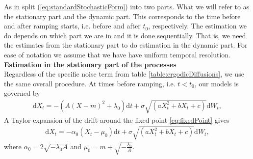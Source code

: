 As in \cite{Ditlevsen2023} split (\ref{eq:standardStochasticForm}) into two parts. What we will refer to as the stationary part and the dynamic part. This corresponds to the time before and after ramping starts, i.e. before and after $t_0$, respectively. The estimation we do depends on which part we are in and it is done sequentially. That is, we need the estimates from the stationary part to do estimation in the dynamic part. For ease of notation we assume that we have have uniform temporal resolution. \\
\textbf{Estimation in the stationary part of the processes}\\
Regardless of the specific noise term from table \ref{table:ergodicDiffusions}, we use the same overall procedure. At times before ramping, i.e. $t < t_0$, our models is governed by
\begin{align}
    \mathrm{d}X_t = -\left(A(X - m)^2 + \lambda_0\right)\mathrm{d}t + \sigma\sqrt{\left(aX_t^2 + bX_t + c\right)}\mathrm{d}W_t, 
\end{align}
A Taylor-expansion of the drift around the fixed point \ref{eq:fixedPoint} gives
\begin{align}
    \mathrm{d}X_t = -\alpha_0\left(X_t - \mu_0\right)\mathrm{d}t + \sigma\sqrt{\left(aX_t^2 + bX_t + c\right)}\mathrm{d}W_t, \label{eq:TaylorStationary}
\end{align}
where $\alpha_0 = 2\sqrt{-\lambda_0 A}$ and $\mu_0 = m + \sqrt{-\frac{\lambda_0}{A}}$.


